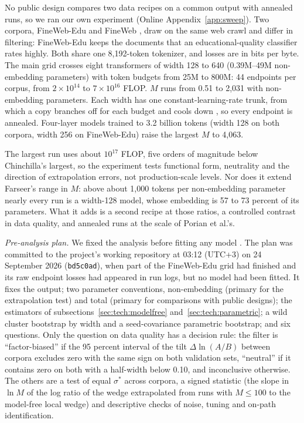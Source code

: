 No public design compares two data recipes on a common output with annealed runs, so we ran our own experiment (Online
Appendix~\ref{app:sweep}). Two corpora, FineWeb-Edu and FineWeb \citep{penedo2024fineweb}, draw on the same web crawl
and differ in filtering: FineWeb-Edu keeps the documents that an educational-quality classifier rates highly. Both share
one 8,192-token tokenizer, and losses are in bits per byte. The main grid crosses eight transformers of width 128 to 640
(0.39M--49M non-embedding parameters) with token budgets from 25M to 800M: 44 endpoints per corpus, from
$2\times10^{14}$ to $7\times10^{16}$ FLOP. $M$ runs from 0.51 to 2,031 with non-embedding parameters. Each width has one constant-learning-rate trunk, from which a copy branches off for
each budget and cools down \citep{hagele2024scaling}, so every endpoint is annealed. Four-layer models trained to 3.2
billion tokens (width 128 on both corpora, width 256 on FineWeb-Edu) raise the largest $M$ to 4,063.

The largest run uses about $10^{17}$ FLOP, five orders of magnitude below Chinchilla's largest, so the experiment tests
functional form, neutrality and the direction of extrapolation errors, not production-scale levels. Nor does it extend
Farseer's range in $M$: above about 1,000 tokens per non-embedding parameter nearly every run is a width-128 model, whose
embedding is 57 to 73 percent of its parameters. What it adds is a second recipe at those ratios, a controlled contrast
in data quality, and annealed runs at the scale of Porian et al.'s.

\textit{Pre-analysis plan.} We fixed the analysis before fitting any model \citep[on such plans,
see][]{olken2015promises}. The plan was committed to the project's working repository at 03:12 (UTC+3) on 24 September
2026 (\texttt{bd5c0ad}), when part of the FineWeb-Edu grid had finished and its raw endpoint losses had appeared in run
logs, but no model had been fitted. It fixes the output; two parameter conventions, non-embedding (primary for the
extrapolation test) and total (primary for comparisons with public designs); the estimators of
subsections~\ref{sec:tech:modelfree} and~\ref{sec:tech:parametric}; a wild cluster bootstrap by width
\citep{webb2023reworking} and a seed-covariance parametric bootstrap; and six questions. Only the question on data
quality has a decision rule: the filter is ``factor-biased'' if the 95 percent interval of the tilt $\Delta\ln(A/B)$
between corpora excludes zero with the same sign on both validation sets, ``neutral'' if it contains zero on both with a
half-width below 0.10, and inconclusive otherwise. The others are a test of equal $\sigma^*$ across corpora, a signed
statistic (the slope in $\ln M$ of the log ratio of the wedge extrapolated from runs with $M\le100$ to the model-free
local wedge) and descriptive checks of noise, tuning and on-path identification.


